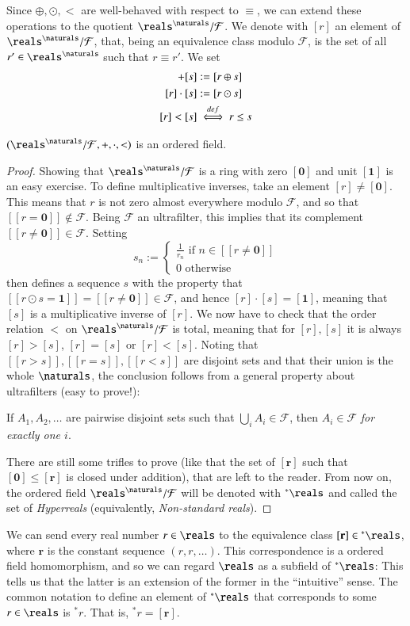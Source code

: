 \documentclass[adraft, copyright,creativecommons,sharealike,noncommercial]{eptcs}
\newcommand{\nstar}{{^*}}
\begin{document}
Since $\oplus, \odot, <$ are well-behaved with respect to $\equiv$, we can extend these operations to the quotient $\reals^\naturals/ \mathcal{F}$. We denote with $[r]$ an element of $\reals^\naturals/ \mathcal{F}$, that, being an equivalence class modulo $\mathcal{F}$, is the set of all $r' \in \reals^\naturals$ such that $r \equiv r'$. We set
\begin{align*}
	[r] + [s] &:= [r \oplus s]\\
	[r] \cdot [s] &:= [r \odot s]\\
	[r] < [s] &\iffdef r \leq s	
\end{align*}
\begin{theorem}
	$(\reals^\naturals/ \mathcal{F}, +, \cdot, <)$ is an ordered field. 
\end{theorem} 
\begin{proof}
	Showing that $\reals^\naturals/ \mathcal{F}$ is a ring with zero $[\mathbf{0}]$ and unit $[\mathbf{1}]$ is an easy exercise. To define multiplicative inverses, take an element $[r] \neq [\mathbf{0}]$. This means that $r$ is not zero almost everywhere modulo $\mathcal{F}$, and so that $[[r = \mathbf{0}]] \notin \mathcal{F}$. Being $\mathcal{F}$ an ultrafilter, this implies that its complement $[[r \neq \mathbf{0}]] \in \mathcal{F}$.
	Setting
	\[
	s_n := \begin{cases}
	\frac{1}{r_n} \text{ if } n \in [[r \neq \mathbf{0}]]\\
	0 \text{ otherwise}
	\end{cases}
	\]
	then defines a sequence $s$ with the property that $[[r \odot s = \mathbf{1}]] = [[r \neq \mathbf{0}]] \in \mathcal{F}$, and hence $[r] \cdot [s] = [\mathbf{1}]$, meaning that $[s]$ is a multiplicative inverse of $[r]$.
	We now have to check that the order relation $<$ on $\reals^\naturals/ \mathcal{F}$ is total, meaning that for $[r],[s]$ it is always $[r]>[s]$, $[r]=[s]$ or $[r]<[s]$.
	Noting that $[[r > s]], [[r=s]], [[r < s]]$ are disjoint sets and that their union is the whole $\naturals$, the conclusion follows from a general property about ultrafilters (easy to prove!):
	\begin{center}
		If $A_1, A_2, \dots$ are pairwise disjoint sets such that $\bigcup_i A_i \in \mathcal{F}$, then $A_i \in \mathcal{F}$ \emph{for exactly one $i$}.
	\end{center}
	There are still some trifles to prove (like that the set of $[\mathbf{r}]$ such that $[\mathbf{0}] \leq [\mathbf{r}]$ is closed under addition), that are left to the reader. From now on, the ordered field $\reals^\naturals/ \mathcal{F}$ will be denoted with $\nstar \reals$ and called the set of \emph{Hyperreals} (equivalently, \emph{Non-standard reals}). 
\end{proof}	
%
We can send every real number $r \in \reals$ to the equivalence class $[\mathbf{r}] \in  {\nstar \reals}$, where $\mathbf{r}$ is the constant sequence $(r,r, \dots)$. This correspondence is a ordered field homomorphism, and so we can regard $\reals$ as a subfield of $\nstar \reals$: This tells us that the latter is an extension of the former in the ``intuitive'' sense. The common notation to define an element of $\nstar \reals$ that corresponds to some $r \in \reals$ is $\nstar r$. That is, $\nstar r = [\mathbf{r}]$.
\end{document}
